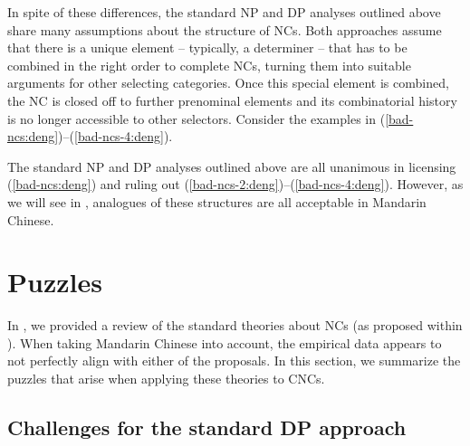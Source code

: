 \documentclass[output=paper,colorlinks,citecolor=brown]{langscibook}
\begin{document}
In spite of these differences, the standard NP and DP analyses outlined above share many assumptions about the structure of NCs. Both approaches assume that there is a unique element -- typically, a determiner -- that has to be combined in the right order to complete NCs, turning them into suitable arguments for other selecting categories.  Once this special element is combined, the NC is closed off to further prenominal elements and its combinatorial history is no longer accessible  to other selectors. Consider the examples in (\ref{bad-ncs:deng})--(\ref{bad-ncs-4:deng}).


	 \label{bad-ncs:deng}
	 \label{bad-ncs-2:deng}
	 \label{bad-ncs-3:deng}
	 \label{bad-ncs-4:deng}
	\z

\noindent The standard NP and DP analyses outlined above are all unanimous in licensing (\ref{bad-ncs:deng}) and ruling out (\ref{bad-ncs-2:deng})--(\ref{bad-ncs-4:deng}). However, as we will see in , analogues of these structures are all acceptable in Mandarin Chinese. 



\section{Puzzles} 
\label{sec:puz:deng}

In , we provided a review of the standard theories about NCs (as proposed within ).  
When taking Mandarin Chinese into account, the empirical data appears to not perfectly align with either of the proposals.  
%
In this section, we summarize the puzzles that arise when applying these theories to CNCs.


\subsection{Challenges for the standard DP approach}\label{sec:con-dp:deng}
\end{document}
